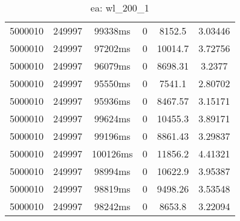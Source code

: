 \documentclass[./main.tex]{subfiles}
\begin{document}
\begin{table}
\begin{tabular}{ c | c | c | c | c | c }
        \hline
        5000010 & 249997 & 99338ms & 0 & 8152.5 & 3.03446 \\
        5000010 & 249997 & 97202ms & 0 & 10014.7 & 3.72756 \\
        5000010 & 249997 & 96079ms & 0 & 8698.31 & 3.2377 \\
        5000010 & 249997 & 95550ms & 0 & 7541.1 & 2.80702 \\
        5000010 & 249997 & 95936ms & 0 & 8467.57 & 3.15171 \\
        5000010 & 249997 & 99624ms & 0 & 10455.3 & 3.89171 \\
        \rowcolor{lightgray} 5000010 & 249997 & 99196ms & 0 & 8861.43 & 3.29837 \\
        5000010 & 249997 & 100126ms & 0 & 11856.2 & 4.41321 \\
        5000010 & 249997 & 98994ms & 0 & 10622.9 & 3.95387 \\
        5000010 & 249997 & 98819ms & 0 & 9498.26 & 3.53548 \\
        5000010 & 249997 & 98242ms & 0 & 8653.8 & 3.22094 \\
    \end{tabular}
    \caption{ea: wl\_200\_1}
\end{table}
\end{document}
